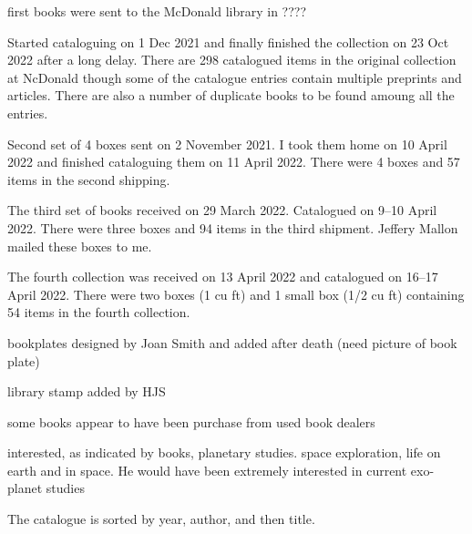 first books were sent to the McDonald library in ????

Started cataloguing on 1 Dec 2021 and finally finished the collection
on 23 Oct 2022 after a long delay. There are 298 catalogued items in
the original collection at NcDonald though some of the catalogue
entries contain multiple preprints and articles.  There are also a
number of duplicate books to be found amoung all the entries.

Second set of 4 boxes sent on 2 November 2021.  I took them home on 10
April 2022 and finished cataloguing them on 11 April 2022. There were
4 boxes and 57 items in the second shipping.

The third set of books received on 29 March 2022. Catalogued on 9--10
April 2022. There were three boxes and 94 items in the third
shipment. Jeffery Mallon mailed these boxes to me.

The fourth collection was received on 13 April 2022 and catalogued on
16--17 April 2022. There were two boxes (1 cu ft) and 1 small box (1/2 cu
ft) containing 54 items in the fourth collection.

bookplates designed by Joan Smith and added after death (need picture
of book plate)

library stamp added by HJS

some books appear to have been purchase from used book dealers

interested, as indicated by books, planetary studies. space
exploration, life on earth and in space. He would have been extremely
interested in current exo-planet studies

The catalogue is sorted by year, author, and then title.
